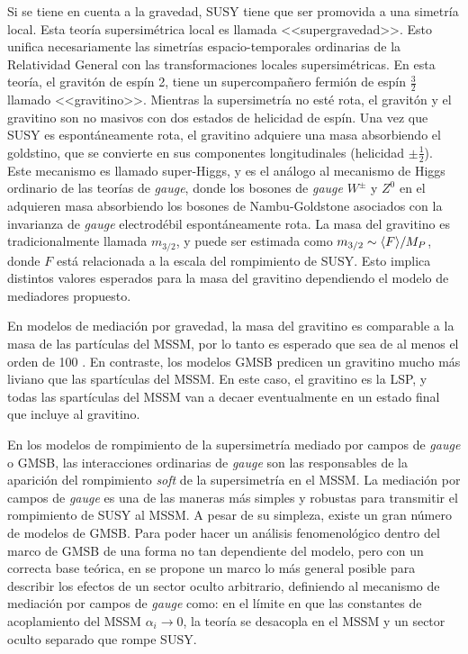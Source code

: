 Si se tiene en cuenta a la gravedad, SUSY tiene que ser promovida a una simetría
local. Esta teoría supersimétrica local es llamada <<supergravedad>>. Esto
unifica necesariamente las simetrías espacio-temporales ordinarias de la
Relatividad General con las transformaciones locales supersimétricas. En esta
teoría, el gravitón de espín 2, tiene un supercompa\~nero fermión de espín $\frac{3}{2}$
llamado <<gravitino>>. Mientras la supersimetría no esté rota, el gravitón y
el gravitino son no masivos con dos estados de helicidad de espín. Una vez que
SUSY es espontáneamente rota, el gravitino adquiere una masa absorbiendo el
goldstino, que se convierte en sus componentes longitudinales (helicidad $\pm
\frac{1}{2}$). Este mecanismo es llamado super-Higgs, y es el análogo al
mecanismo de Higgs ordinario de las teorías de \emph{gauge}, donde los bosones de \emph{gauge}
$W^\pm$ y $Z^0$ en el {\SM} adquieren masa absorbiendo los bosones de
Nambu-Goldstone asociados con la invarianza de \emph{gauge} electrodébil
espontáneamente rota. La masa del gravitino es tradicionalmente llamada
$m_{3/2}$, y puede ser estimada como $m_{3/2} \sim \langle F \rangle / M_P$,
donde $F$ está relacionada a la escala del rompimiento de SUSY. Esto implica
distintos valores esperados para la masa del gravitino dependiendo el modelo de
mediadores propuesto.

En modelos de mediación por gravedad, la masa del gravitino es comparable a la
masa de las partículas del MSSM, por lo tanto es esperado que sea de al menos el
orden de 100 \gev. En contraste, los modelos GMSB predicen un gravitino mucho
más liviano que las spartículas del MSSM. En este caso, el gravitino es la LSP,
y todas las spartículas del MSSM van a decaer eventualmente en un estado final
que incluye al gravitino.

En los modelos de rompimiento de la supersimetría mediado por campos de \emph{gauge} o
GMSB, las interacciones ordinarias de \emph{gauge} son las responsables de la aparición
del rompimiento \emph{soft} de la supersimetría en el MSSM.
La mediación por campos de \emph{gauge} es una de las maneras más simples y robustas
para transmitir el rompimiento de SUSY al MSSM. A pesar de su simpleza, existe
un gran número de modelos de GMSB. Para poder hacer un análisis fenomenológico
dentro del marco de GMSB de una forma no tan dependiente del modelo, pero con un
correcta base teórica, en \cite{GGM} se propone un marco lo más general posible
para describir los efectos de un sector oculto arbitrario, definiendo al
mecanismo de mediación por campos de \emph{gauge} como: en el límite en que las
constantes de acoplamiento del MSSM $\alpha_i \to 0$, la teoría se desacopla
en el MSSM y un sector oculto separado que rompe SUSY.

